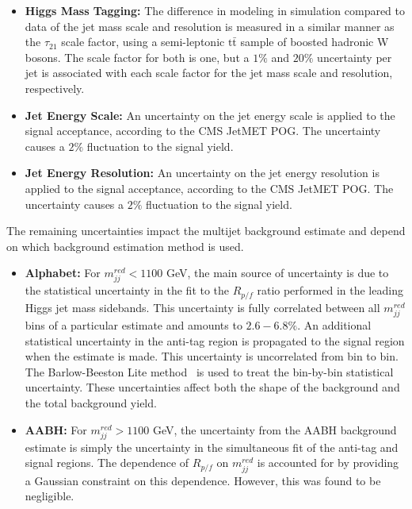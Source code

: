 \begin{itemize}
\item \textbf{Higgs Mass Tagging:} The difference in modeling in simulation compared to data of the jet mass scale and resolution is measured in a similar manner as the $\tau_{21}$ scale factor, using a semi-leptonic $\mathrm{t\bar{t}}$ sample of boosted hadronic W bosons. The scale factor for both is one, but a $1\%$ and $20\%$ uncertainty per jet is associated with each scale factor for the jet mass scale and resolution, respectively.

\item \textbf{Jet Energy Scale:} An uncertainty on the jet energy scale is applied to the signal acceptance, according to the CMS JetMET POG. The uncertainty causes a $2\%$ fluctuation to the signal yield.

\item \textbf{Jet Energy Resolution:} An uncertainty on the jet energy resolution is applied to the signal acceptance, according to the CMS JetMET POG. The uncertainty causes a $2\%$ fluctuation to the signal yield.

\end{itemize}

The remaining uncertainties impact the multijet background estimate and depend on which background estimation method is used.

\begin{itemize}

\item \textbf{Alphabet:} For $m_{jj}^{red} < 1100$ GeV, the main source of uncertainty is due to the statistical uncertainty in the fit to the $R_{p/f}$ ratio performed in the leading Higgs jet mass sidebands. This uncertainty is fully correlated between all $m_{jj}^{red}$ bins of a particular estimate and amounts to $2.6-6.8\%$. An additional statistical uncertainty in the anti-tag region is propagated to the signal region when the estimate is made. This uncertainty is uncorrelated from bin to bin. The Barlow-Beeston Lite method~\cite{Barlow} is used to treat the bin-by-bin statistical uncertainty. These uncertainties affect both the shape of the background and the total background yield.

\item \textbf{AABH:} For $m_{jj}^{red} > 1100$ GeV, the uncertainty from the AABH background estimate is simply the uncertainty in the simultaneous fit of the anti-tag and signal regions. The dependence of $R_{p/f}$ on $m_{jj}^{red}$ is accounted for by providing a Gaussian constraint on this dependence. However, this was found to be negligible.

\end{itemize}

